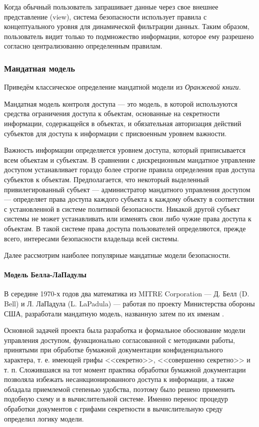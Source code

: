 Когда обычный пользователь запрашивает данные через свое внешнее представление (view), система безопасности использует правила с концептуального уровня для динамической фильтрации данных. Таким образом, пользователь видит только то подмножество информации, которое ему разрешено согласно централизованно определенным правилам.

\subsubsection{Мандатная модель}

Приведём классическое определение мандатной модели из \textit{Оранжевой книги}.

\begin{grayquote}
Мандатная модель контроля доступа --- это модель, в которой используются средства ограничения доступа к объектам, основанные на секретности информации, содержащейся в объектах, и обязательная авторизация действий субъектов для доступа к информации с присвоенным уровнем важности.
\end{grayquote}

Важность информации определяется уровнем доступа, который приписывается всем объектам и субъектам. В сравнении с дискреционным мандатное управление доступом устанавливает гораздо более строгие правила определения прав доступа субъектов к объектам. Предполагается, что некоторый выделенный привилегированный субъект --- администратор мандатного управления доступом --- определяет права доступа каждого субъекта к каждому объекту в соответствии с установленной в системе политикой безопасности. Никакой другой субъект системы не может устанавливать или изменять свои либо чужие права доступа к объектам. В такой системе права доступа пользователей определяются, прежде всего, интересами безопасности владельца всей системы.

Далее рассмотрим наиболее популярные мандатные модели безопасности.

\paragraph{Модель Белла-ЛаПадулы}

В середине 1970-х годов два математика из MITRE Corporation --- Д. Белл (D. Bell) и Л. ЛаПадула (L. LaPadula) --- работая по проекту Министерства обороны США, разработали мандатную модель, названную затем по их именам \cite{BellLaPadulaModel}.

Основной задачей проекта была разработка и формальное обоснование модели управления доступом, функционально согласованной с методиками работы, принятыми при обработке бумажной документации конфиденциального характера, т. е. имеющей грифы <<секретно>>, <<совершенно секретно>> и т. п. Сложившаяся на тот момент практика обработки бумажной документации позволяла избежать несанкционированного доступа к информации, а также обладала приемлемой степенью удобства, поэтому было решено применить подобную схему и в вычислительной системе. Именно перенос процедур обработки документов с грифами секретности в вычислительную среду определил логику модели.

